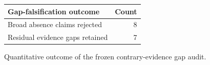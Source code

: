 \begin{figure}[H]\centering\begin{tabular}{lr}\toprule Gap-falsification outcome & Count\\\midrule Broad absence claims rejected & 8\\ Residual evidence gaps retained & 7\\\bottomrule\end{tabular}\caption{Quantitative outcome of the frozen contrary-evidence gap audit.}\label{fig:gapoutcomes}\end{figure}